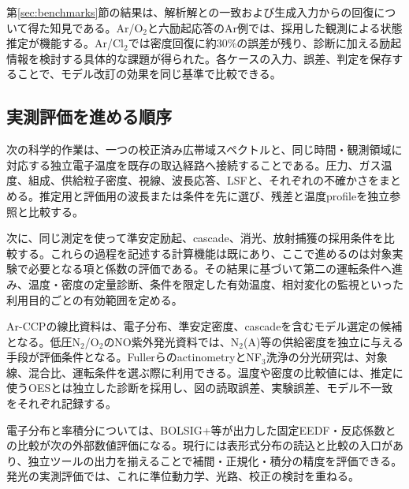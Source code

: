 第\ref{sec:benchmarks}節の結果は、解析解との一致および生成入力からの回復について得た知見である。Ar/O$_2$と六励起応答のAr例では、採用した観測による状態推定が機能する。Ar/Cl$_2$では密度回復に約30\%の誤差が残り、診断に加える励起情報を検討する具体的な課題が得られた。各ケースの入力、誤差、判定を保存することで、モデル改訂の効果を同じ基準で比較できる。

\subsection{実測評価を進める順序}
次の科学的作業は、一つの校正済み広帯域スペクトルと、同じ時間・観測領域に対応する独立電子温度を既存の取込経路へ接続することである。圧力、ガス温度、組成、供給粒子密度、視線、波長応答、LSFと、それぞれの不確かさをまとめる。推定用と評価用の波長または条件を先に選び、残差と温度profileを独立参照と比較する。

次に、同じ測定を使って準安定励起、cascade、消光、放射捕獲の採用条件を比較する。これらの過程を記述する計算機能は既にあり、ここで進めるのは対象実験で必要となる項と係数の評価である。その結果に基づいて第二の運転条件へ進み、温度・密度の定量診断、条件を限定した有効温度、相対変化の監視といった利用目的ごとの有効範囲を定める。

Ar-CCPの線比資料\cite{arellano}は、電子分布、準安定密度、cascadeを含むモデル選定の候補となる。低圧N$_2$/O$_2$のNO紫外発光資料\cite{schuecke}では、N$_2$(A)等の供給密度を独立に与える手段が評価条件となる。Fullerらのactinometry\cite{fuller}とNF$_3$洗浄の分光研究\cite{an2023}は、対象線、混合比、運転条件を選ぶ際に利用できる。温度や密度の比較値には、推定に使うOESとは独立した診断を採用し、図の読取誤差、実験誤差、モデル不一致をそれぞれ記録する。

電子分布と率積分については、BOLSIG+等が出力した固定EEDF・反応係数との比較が次の外部数値評価になる\cite{hagelaar,lxcat}。現行には表形式分布の読込と比較の入口があり、独立ツールの出力を揃えることで補間・正規化・積分の精度を評価できる。発光の実測評価では、これに準位動力学、光路、校正の検討を重ねる。

